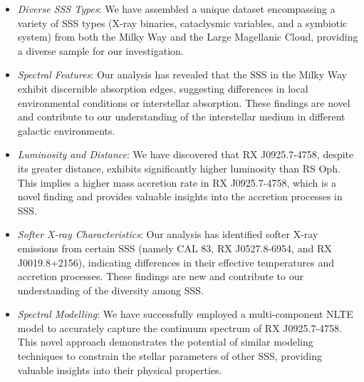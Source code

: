     \begin{itemize}
    	\item \textit{Diverse SSS Types}: We have assembled a unique dataset encompassing a variety of SSS types (X-ray binaries, cataclysmic variables, and a symbiotic system) from both the Milky Way and the Large Magellanic Cloud, providing a diverse sample for our investigation.
    	
    	\item \textit{Spectral Features}: Our analysis has revealed that the SSS in the Milky Way exhibit discernible absorption edges, suggesting differences in local environmental conditions or interstellar absorption. These findings are novel and contribute to our understanding of the interstellar medium in different galactic environments.
    	
    	\item \textit{Luminosity and Distance}: We have discovered that RX J0925.7-4758, despite its greater distance, exhibits significantly higher luminosity than RS Oph. This implies a higher mass accretion rate in RX J0925.7-4758, which is a novel finding and provides valuable insights into the accretion processes in SSS.
    	
    	\item \textit{Softer X-ray Characteristics}: Our analysis has identified softer X-ray emissions from certain SSS (namely CAL 83, RX J0527.8-6954, and RX J0019.8+2156), indicating differences in their effective temperatures and accretion processes. These findings are new and contribute to our understanding of the diversity among SSS.
    	
    	\item \textit{Spectral Modelling}: We have successfully employed a multi-component NLTE model to accurately capture the continuum spectrum of RX J0925.7-4758. This novel approach demonstrates the potential of similar modeling techniques to constrain the stellar parameters of other SSS, providing valuable insights into their physical properties.
    \end{itemize}
    
